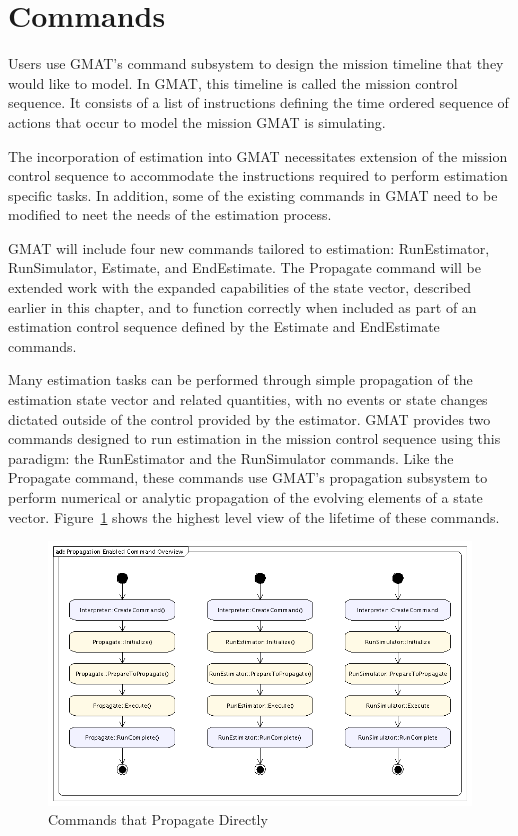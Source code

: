 \section{Commands}

Users use GMAT's command subsystem to design the mission timeline that they would like to model.
In GMAT, this timeline is called the mission control sequence.  It consists of a list of
instructions defining the time ordered sequence of actions that occur to model the mission GMAT is
simulating.

The incorporation of estimation into GMAT necessitates extension of the mission control sequence to
accommodate the instructions required to perform estimation specific tasks.  In addition, some of
the existing commands in GMAT need to be modified to neet the needs of the estimation process.

GMAT will include four new commands tailored to estimation: RunEstimator, RunSimulator, Estimate,
and EndEstimate.  The Propagate command will be extended work with the expanded capabilities of the
state vector, described earlier in this chapter, and to function correctly when included as part of
an estimation control sequence defined by the Estimate and EndEstimate commands.

Many estimation tasks can be performed through simple propagation of the estimation state vector
and related quantities, with no events or state changes dictated outside of the control provided by
the estimator.  GMAT provides two commands designed to run estimation in the mission control
sequence using this paradigm: the RunEstimator and the RunSimulator commands.  Like the
Propagate command, these commands use GMAT's propagation subsystem to perform numerical or analytic
propagation of the evolving elements of a state vector.  Figure~\ref{fig:PropEnabledCommands} shows
the highest level view of the lifetime of these commands.

\begin{figure}[htb]
\centering
\includegraphics[400,250]{Images/PropagationEnabledCommandOverview.png}
\caption{Commands that Propagate Directly}
\label{fig:PropEnabledCommands}
\end{figure}

